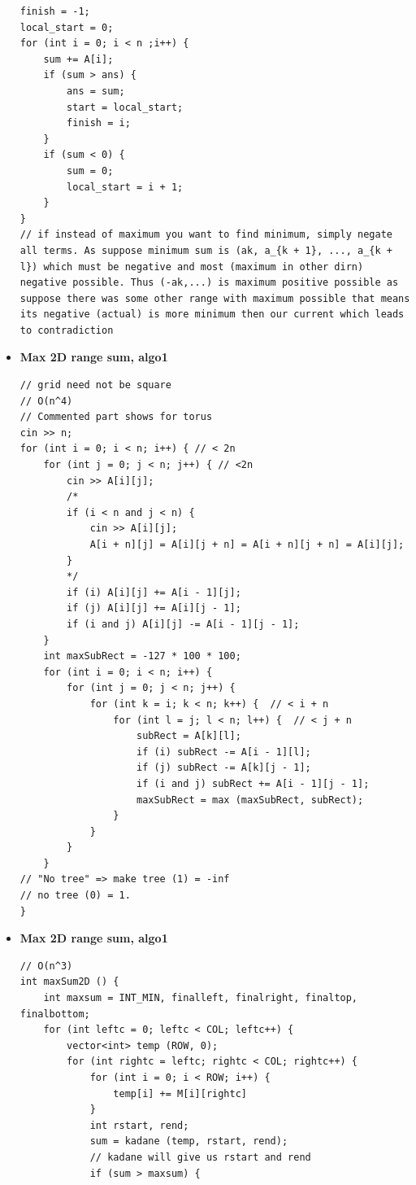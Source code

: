\documentclass[8pt, a4paper, oneside, twocolumn]{extarticle}
\begin{document}
\begin{itemize}
\begin{verbatim}
finish = -1;
local_start = 0;
for (int i = 0; i < n ;i++) {
    sum += A[i];
    if (sum > ans) {
        ans = sum;
        start = local_start;
        finish = i;
    }
    if (sum < 0) {
        sum = 0;
        local_start = i + 1;
    }
}
// if instead of maximum you want to find minimum, simply negate all terms. As suppose minimum sum is (ak, a_{k + 1}, ..., a_{k + l}) which must be negative and most (maximum in other dirn) negative possible. Thus (-ak,...) is maximum positive possible as suppose there was some other range with maximum possible that means its negative (actual) is more minimum then our current which leads to contradiction
    \end{verbatim}
    \item \textbf{Max 2D range sum, algo1}
    \begin{verbatim}
// grid need not be square
// O(n^4)
// Commented part shows for torus
cin >> n;
for (int i = 0; i < n; i++) { // < 2n
    for (int j = 0; j < n; j++) { // <2n
        cin >> A[i][j]; 
        /*
        if (i < n and j < n) {
            cin >> A[i][j];
            A[i + n][j] = A[i][j + n] = A[i + n][j + n] = A[i][j];
        }
        */
        if (i) A[i][j] += A[i - 1][j];
        if (j) A[i][j] += A[i][j - 1];
        if (i and j) A[i][j] -= A[i - 1][j - 1];
    }
    int maxSubRect = -127 * 100 * 100;
    for (int i = 0; i < n; i++) {
        for (int j = 0; j < n; j++) {
            for (int k = i; k < n; k++) {  // < i + n
                for (int l = j; l < n; l++) {  // < j + n
                    subRect = A[k][l];
                    if (i) subRect -= A[i - 1][l];
                    if (j) subRect -= A[k][j - 1];
                    if (i and j) subRect += A[i - 1][j - 1];
                    maxSubRect = max (maxSubRect, subRect);
                }
            }
        }
    }
// "No tree" => make tree (1) = -inf
// no tree (0) = 1.
}
    \end{verbatim}
    \item \textbf{Max 2D range sum, algo1} 
    \begin{verbatim}
// O(n^3)
int maxSum2D () {
    int maxsum = INT_MIN, finalleft, finalright, finaltop, finalbottom;
    for (int leftc = 0; leftc < COL; leftc++) {
        vector<int> temp (ROW, 0);
        for (int rightc = leftc; rightc < COL; rightc++) {
            for (int i = 0; i < ROW; i++) {
                temp[i] += M[i][rightc]
            }
            int rstart, rend;
            sum = kadane (temp, rstart, rend);
            // kadane will give us rstart and rend
            if (sum > maxsum) {

\end{verbatim}
\end{itemize}
\end{document}
